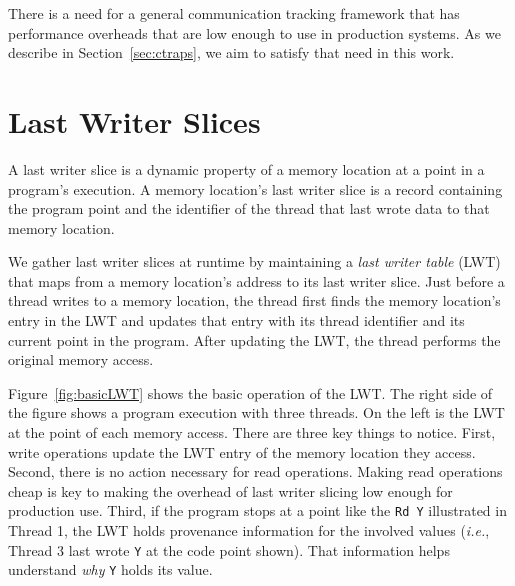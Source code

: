 \documentclass[preprint,10pt]{sigplanconf}
\newcommand{\lwt}{LWT\xspace}
\begin{document}
There is a need for a general communication tracking framework that has
performance overheads that are low enough to use in production systems.  As we
describe in Section~\ref{sec:ctraps}, we aim to satisfy that need in this work.








\section{Last Writer Slices}
\label{sec:lastwriterslices}
A last writer slice is a dynamic property of a memory location at a point in a
program's execution.   A memory location's last writer slice is a record
containing the program point and the identifier of the thread that last wrote
data to that memory location.  


We gather last writer slices at runtime by maintaining a {\em last writer
table} (\lwt) that maps from a memory location's address to its last writer
slice.  Just before a thread writes to a memory location, the thread first
finds the memory location's entry in the \lwt and updates that entry with its
thread identifier and its current point in the program.  After updating the
\lwt, the thread performs the original memory access.  


Figure~\ref{fig:basicLWT} shows the basic operation of the \lwt.  The right
side of the figure shows a program execution with three threads.  On the left
is the \lwt at the point of each memory access.  There are three key things to
notice.  First, write operations update the \lwt entry of the memory location
they access.  Second, there is no action necessary for read operations.  Making
read operations cheap is key to making the overhead of last writer slicing low
enough for production use.  Third, if the program stops at a point like the
{\tt Rd Y} illustrated in Thread 1, the \lwt holds provenance information for
the involved values ({\em i.e.}, Thread 3 last wrote {\tt Y} at the code point
shown). That information helps understand {\em why} {\tt Y} holds its value.
\end{document}
